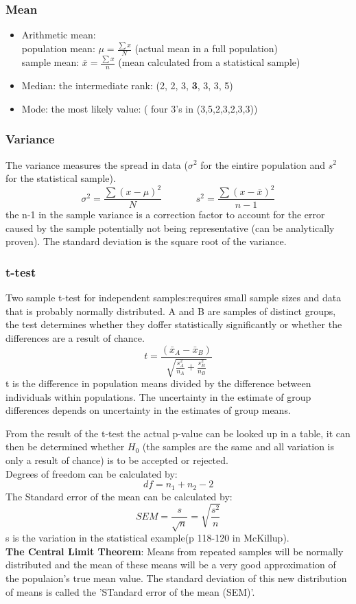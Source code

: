 \documentclass{article}
\begin{document}
\subsubsection{Mean}
\begin{itemize}
    \item Arithmetic mean: \\
    population mean: $\mu = \frac{\sum x}{N}$ (actual mean in a full population)\\
    sample mean: $\bar{x} = \frac{\sum x}{n}$ (mean calculated from a statistical sample)
    \item Median: the intermediate rank: (2, 2, 3, \textbf{3}, 3, 3, 5)
    \item Mode: the most likely value: ( four 3's in (3,5,2,3,2,3,3))
\end{itemize}

\subsubsection{Variance}
The variance measures the spread in data ($\sigma ^2$ for the eintire population and $s^2$ for the statistical sample).
$$\sigma^2 = \frac{\sum(x-\mu)^2}{N} \: \: \: \: \: \: \;\;\;\;\;\;\;\; s^2 = \frac{\sum(x - \bar{x})^2}{n-1} $$
the n-1 in the sample variance is a correction factor to account for the error caused by the sample potentially not being representative (can be analytically proven). The standard deviation is the square root of the variance.

\subsubsection{t-test} \label{ttest}
Two sample t-test for independent samples:requires small sample sizes and data that is probably normally distributed. A and B are samples of distinct groups, the test determines whether they doffer statistically significantly or whether the differences are a result of chance.
$$t = \frac{(\bar{x}_{A} - \bar{x}_{B})}{\sqrt{\frac{s_{A}^2}{n_{A}} + \frac{s_{B}^2}{n_{B}}}}$$
t is the difference in population means divided by the difference between individuals within populations. The uncertainty in the estimate of group differences depends on uncertainty in the estimates of group means.\par 
From the result of the t-test the actual p-value can be looked up in a table, it can then be determined whether $H_0$ (the samples are the same and all variation is only a result of chance) is to be accepted or rejected.\\
Degrees of freedom can be calculated by: $$df = n_1 + n_2 -2$$ 
The Standard error of the mean can be calculated by: $$SEM= \frac{s}{\sqrt{n}}= \sqrt{\frac{s^2}{n}}$$
s is the variation in the statistical example(p 118-120 in McKillup).\\
\textbf{The Central Limit Theorem}: Means from repeated samples will be normally distributed and the mean of these means will be a very good approximation of the populaion's true mean value. The standard deviation of this new distribution of means is called the 'STandard error of the mean (SEM)'.\par 
\end{document}

